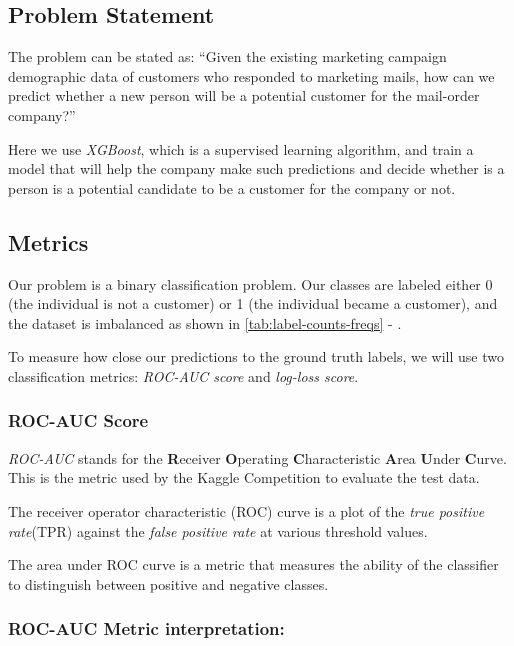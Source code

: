 \documentclass[a4paper]{article}
\begin{document}
{    \subsection{Problem Statement}

    The problem can be stated as: ``Given the existing marketing campaign demographic data of customers who responded to marketing mails, how can we predict whether a new person will be a potential customer for the mail-order company?''

    Here we use \emph{XGBoost}, which is a supervised learning algorithm,  and train a model that will help the company make such predictions and decide whether is a person is a potential candidate to be a customer for the company or not.

    \subsection{Metrics}
    \label{sec:metrics}
    Our problem is a binary classification problem. Our classes are labeled either 0 (the individual is not a customer) or 1 (the individual became a customer), and the dataset is imbalanced as shown in \autoref{tab:label-counts-freqs} - .

    To measure how close our predictions to the ground truth labels, we will use two classification metrics: \emph{ROC-AUC score} and \emph{log-loss score}.

    \subsubsection{ROC-AUC Score}
    \label{sec:accuracy}
    \emph{ROC-AUC} stands for the \textbf{R}eceiver \textbf{O}perating \textbf{C}haracteristic \textbf{A}rea \textbf{U}nder \textbf{C}urve. This is the metric used by the Kaggle Competition to evaluate the test data.

    The receiver operator characteristic (ROC) curve is a plot of the \emph{true positive rate}(TPR) against the \emph{false positive rate} at various threshold values.

    The area under ROC curve is a metric that measures the ability of the classifier to distinguish between positive and negative classes.

    \subsubsection*{ROC-AUC Metric interpretation:}

}
\end{document}
